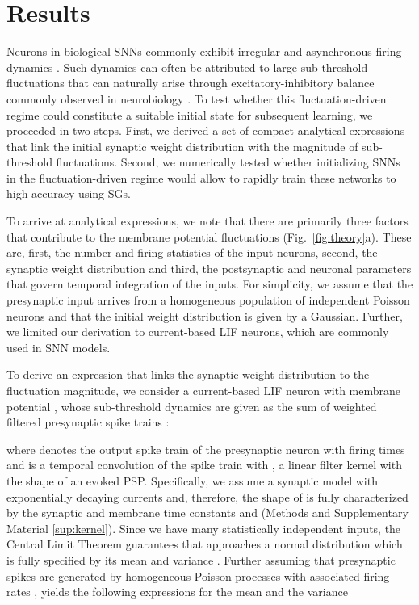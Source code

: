 \documentclass[11pt,a4paper]{article}
\begin{document}
\section*{Results}

Neurons in biological \acp{SNN} commonly exhibit irregular and asynchronous firing dynamics \citep{Tiesinga2000-fc, Kuhn2004-yi, vogels_neural_2005}.
Such dynamics can often be attributed to large sub-threshold fluctuations that can naturally arise through excitatory-inhibitory balance commonly observed in neurobiology \citep{brunel_dynamics_2000, vogels_neural_2005}.
To test  whether this fluctuation-driven regime could constitute a suitable initial state for subsequent learning, we proceeded in two steps. 
First, we derived a set of compact analytical expressions that link the initial synaptic weight distribution with the magnitude of sub-threshold fluctuations.
Second, we numerically tested whether initializing \acp{SNN} in the fluctuation-driven regime would allow to rapidly train these networks to high accuracy using \acp{SG}.

To arrive at analytical expressions, we note that there are primarily three factors that contribute to the membrane potential fluctuations (Fig.~\ref{fig:theory}a).
These are, first, the number and firing statistics of the input neurons, second, the synaptic weight distribution and third, the postsynaptic and neuronal parameters that govern temporal integration of the inputs. 
For simplicity, we assume that the presynaptic input arrives from a homogeneous population of independent Poisson neurons and that the initial weight distribution is given by a Gaussian.
Further, we limited our derivation to current-based \ac{LIF} neurons, which are commonly used in \ac{SNN} models.




To derive an expression that links the synaptic weight distribution to the
fluctuation magnitude, we consider a current-based \ac{LIF} neuron with
membrane potential , whose
sub-threshold dynamics are given as the 
sum of weighted filtered presynaptic spike trains :

where   denotes the output spike train of the presynaptic
neuron  with firing times  and  is a temporal convolution of the spike train  with
, a linear filter kernel with the shape of an evoked \ac{PSP}. 
Specifically, we assume a synaptic model with exponentially decaying currents
and, therefore, the shape of  is fully characterized by the synaptic
and membrane time constants  and 
(Methods and Supplementary Material \ref{sup:kernel}).
Since we have many statistically independent inputs, the Central Limit Theorem guarantees
that  approaches a normal distribution which is fully specified by its mean
 and variance .
Further assuming that presynaptic spikes are generated by homogeneous
Poisson processes with associated firing rates ,  
yields the following expressions for the mean and the variance
\end{document}
